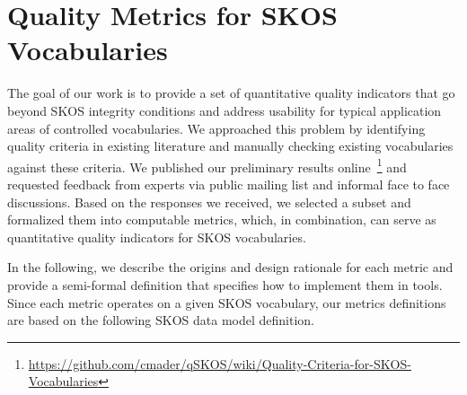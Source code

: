 
\section{Quality Metrics for SKOS Vocabularies}\label{sec:metrics}

The goal of our work is to provide a set of quantitative quality indicators that go beyond SKOS integrity conditions and address usability for typical application areas of controlled vocabularies. We approached this problem by identifying quality criteria in existing literature and manually checking existing vocabularies against these criteria. We published our preliminary results online~\footnote{\url{https://github.com/cmader/qSKOS/wiki/Quality-Criteria-for-SKOS-Vocabularies}} and requested feedback from experts via public mailing list and informal face to face discussions. Based on the responses we received, we selected a subset  and formalized them into computable metrics, which, in combination, can serve as quantitative quality indicators for SKOS vocabularies.


In the following, we describe the origins and design rationale for each metric and provide a semi-formal definition that specifies how to implement them in tools. Since each metric operates on a given SKOS vocabulary, our metrics definitions are based on the following SKOS data model definition.

